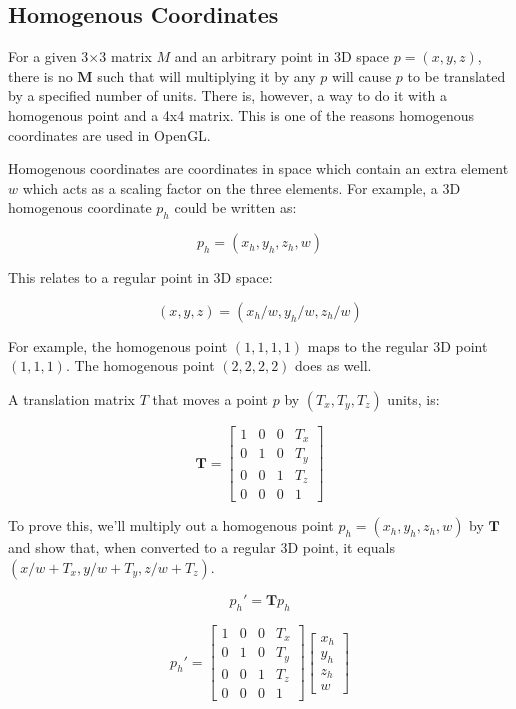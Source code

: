 \subsection{Homogenous Coordinates}
For a given 3$\times$3 matrix $M$ and an arbitrary point in 3D space $p = (x, y, z)$, there is no $\mathbf{M}$ such that will multiplying it by any $p$ will cause $p$ to be translated by a specified number of units. There is, however, a way to do it with a homogenous point and a 4x4 matrix. This is one of the reasons homogenous coordinates are used in OpenGL.

Homogenous coordinates are coordinates in space which contain an extra element $w$ which acts as a scaling factor on the three elements. For example, a 3D homogenous coordinate $p_h$ could be written as:

\[ p_h = (x_h, y_h, z_h, w) \]

This relates to a regular point in 3D space:

\[ (x, y, z) = (x_h / w, y_h / w, z_h / w) \] 

For example, the homogenous point $(1, 1, 1, 1)$ maps to the regular 3D point $(1, 1, 1)$. The homogenous point $(2, 2, 2, 2)$ does as well.

A translation matrix $T$ that moves a point $p$  by $(T_x, T_y, T_z)$ units, is:

\[
\mathbf{T} = \begin{bmatrix}
1 & 0 & 0 & T_x \\
0 & 1 & 0 & T_y \\
0 & 0 & 1 & T_z \\
0 & 0 & 0 & 1
\end{bmatrix}
\]

To prove this, we'll multiply out a homogenous point $p_h = (x_h, y_h, z_h, w)$ by $\mathbf{T}$ and show that, when converted to a regular 3D point, it equals $(x/w + T_x, y/w + T_y, z/w + T_z)$.

\[ p_{h}\prime = \mathbf{T} p_h \]

\[
  p_{h}\prime = \begin{bmatrix}
1 & 0 & 0 & T_x \\
0 & 1 & 0 & T_y \\
0 & 0 & 1 & T_z \\
0 & 0 & 0 & 1
\end{bmatrix} 
\begin{bmatrix}
x_h \\ y_h \\ z_h \\ w 
\end{bmatrix}
\]

